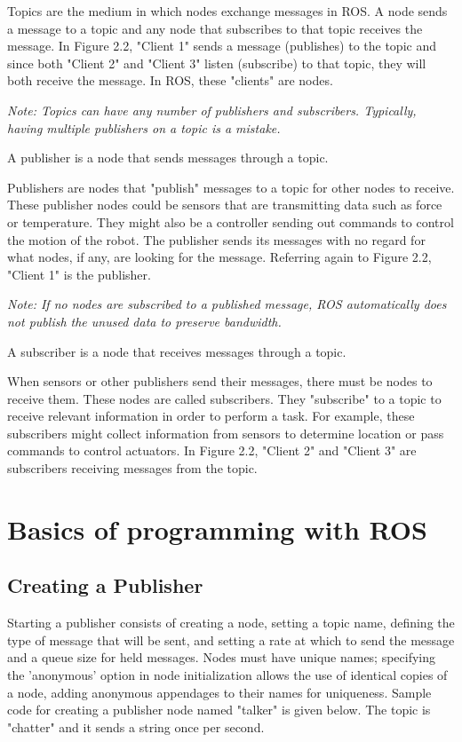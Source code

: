 \documentclass[twoside]{article}
\begin{document}
Topics are the medium in which nodes exchange messages in ROS. A node sends a message to a topic and any node that subscribes to that topic receives the message. In Figure 2.2, "Client 1" sends a message (publishes) to the topic and since both "Client 2" and "Client 3" listen (subscribe) to that topic, they will both receive the message. In ROS, these "clients" are nodes.

{\it Note: Topics can have any number of publishers and subscribers. Typically, having multiple publishers on a topic is a mistake.} \\

\begin{frm-def}[Publisher]
A publisher is a node that sends messages through a topic.
\end{frm-def}

Publishers are nodes that "publish" messages to a topic for other nodes to receive. These publisher nodes could be sensors that are transmitting data such as force or temperature. They might also be a controller sending out commands to control the motion of the robot. The publisher sends its messages with no regard for what nodes, if any, are looking for the message. Referring again to Figure 2.2, "Client 1" is the publisher.

{\it Note: If no nodes are subscribed to a published message, ROS automatically does not publish the unused data to preserve bandwidth.} \\

\begin{frm-def}[Subscriber]
A subscriber is a node that receives messages through a topic.
\end{frm-def}

When sensors or other publishers send their messages, there must be nodes to receive them. These nodes are called subscribers. They "subscribe" to a topic to receive relevant information in order to perform a task. For example, these subscribers might collect information from sensors to determine location or pass commands to control actuators. In Figure 2.2, "Client 2" and "Client 3" are subscribers receiving messages from the topic.\\

\section{Basics of programming with ROS}
\subsection{Creating a Publisher}
Starting a publisher consists of creating a node, setting a topic name, defining the type of message that will be sent, and setting a rate at which to send the message and a queue size for held messages. Nodes must have unique names; specifying the 'anonymous' option in node initialization allows the use of identical copies of a node, adding anonymous appendages to their names for uniqueness.
Sample code for creating a publisher node named "talker" is given below. The topic is "chatter" and it sends a string once per second.
\end{document}
